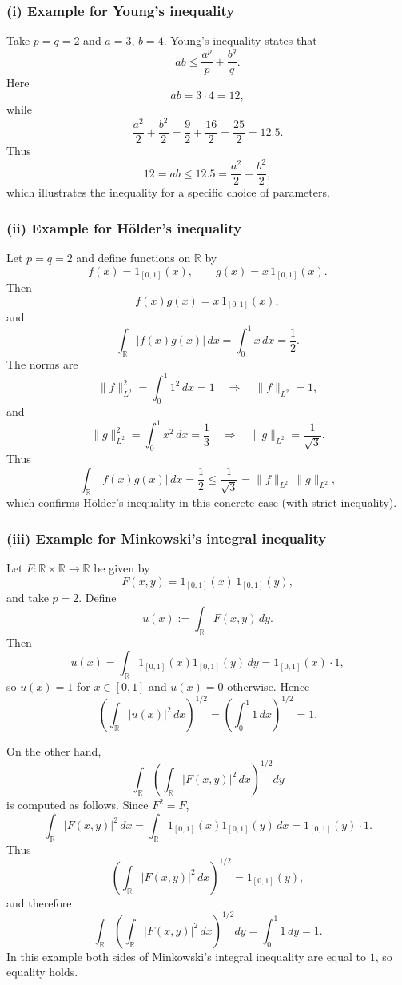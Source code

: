\documentclass[12pt,a4paper]{article}
\theoremstyle{plain}
\theoremstyle{definition}
\theoremstyle{remark}
\theoremstyle{remark}
\begin{document}
\subsubsection*{(i) Example for Young's inequality}

Take $p=q=2$ and $a=3$, $b=4$.  Young's inequality states that
\[
ab \le \frac{a^p}{p} + \frac{b^q}{q}.
\]
Here
\[
ab = 3\cdot 4 = 12,
\]
while
\[
\frac{a^2}{2} + \frac{b^2}{2}
= \frac{9}{2} + \frac{16}{2}
= \frac{25}{2} = 12.5.
\]
Thus
\[
12 = ab \le 12.5 = \frac{a^2}{2} + \frac{b^2}{2},
\]
which illustrates the inequality for a specific choice of parameters.

\bigskip

\subsubsection*{(ii) Example for Hölder's inequality}

Let $p=q=2$ and define functions on $\mathbb{R}$ by
\[
f(x) = 1_{[0,1]}(x), \qquad
g(x) = x\,1_{[0,1]}(x).
\]
Then
\[
f(x)g(x) = x\,1_{[0,1]}(x),
\]
and
\[
\int_{\mathbb{R}} |f(x)g(x)|\,dx
= \int_0^1 x\,dx = \frac12.
\]
The norms are
\[
\|f\|_{L^2}^2 = \int_0^1 1^2\,dx = 1
\quad\Longrightarrow\quad
\|f\|_{L^2} = 1,
\]
and
\[
\|g\|_{L^2}^2 = \int_0^1 x^2\,dx = \frac13
\quad\Longrightarrow\quad
\|g\|_{L^2} = \frac{1}{\sqrt{3}}.
\]
Thus
\[
\int_{\mathbb{R}} |f(x)g(x)|\,dx = \frac12
\le \frac{1}{\sqrt{3}} = \|f\|_{L^2}\,\|g\|_{L^2},
\]
which confirms Hölder's inequality in this concrete case (with strict
inequality).

\bigskip

\subsubsection*{(iii) Example for Minkowski's integral inequality}

Let $F:\mathbb{R}\times\mathbb{R}\to\mathbb{R}$ be given by
\[
F(x,y) = 1_{[0,1]}(x)\,1_{[0,1]}(y),
\]
and take $p=2$.
Define
\[
u(x) := \int_{\mathbb{R}} F(x,y)\,dy.
\]
Then
\[
u(x) = \int_{\mathbb{R}} 1_{[0,1]}(x)1_{[0,1]}(y)\,dy
= 1_{[0,1]}(x)\cdot 1,
\]
so $u(x)=1$ for $x\in[0,1]$ and $u(x)=0$ otherwise. Hence
\[
\left(\int_{\mathbb{R}} |u(x)|^2\,dx\right)^{1/2}
= \left(\int_0^1 1\,dx\right)^{1/2}
= 1.
\]

On the other hand,
\[
\int_{\mathbb{R}}
\left(\int_{\mathbb{R}} |F(x,y)|^2\,dx\right)^{1/2} dy
\]
is computed as follows. Since $F^2=F$,
\[
\int_{\mathbb{R}} |F(x,y)|^2\,dx
= \int_{\mathbb{R}} 1_{[0,1]}(x)1_{[0,1]}(y)\,dx
= 1_{[0,1]}(y)\cdot 1.
\]
Thus
\[
\left(\int_{\mathbb{R}} |F(x,y)|^2\,dx\right)^{1/2}
= 1_{[0,1]}(y),
\]
and therefore
\[
\int_{\mathbb{R}}
\left(\int_{\mathbb{R}} |F(x,y)|^2\,dx\right)^{1/2} dy
= \int_0^1 1\,dy = 1.
\]
In this example both sides of Minkowski's integral inequality are equal to
$1$, so equality holds.
\end{document}
